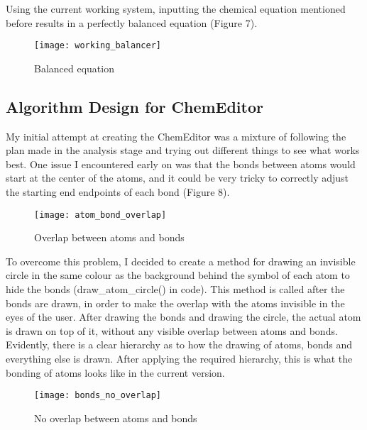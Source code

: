 \documentclass[a4paper,12pt]{article}
\begin{document}
Using the current working system, inputting the chemical equation mentioned before results in a perfectly balanced equation (Figure 7).

\begin{figure} [h]
	\centering
	\texttt{[image: working\_balancer]}
	\caption{Balanced equation}
	\label{fig:working_balancer}
\end{figure}

\newpage

\subsection{Algorithm Design for ChemEditor}

My initial attempt at creating the ChemEditor was a mixture of following the plan made in the analysis stage and trying out different things to see what works best. 
One issue I encountered early on was that the bonds between atoms would start at the center of the atoms, and it could be very tricky to correctly adjust the starting end endpoints of each bond (Figure 8).

\begin{figure} [h]
	\centering
	\texttt{[image: atom\_bond\_overlap]}
	\caption{Overlap between atoms and bonds}
	\label{fig:atom_bond_overlap}
\end{figure}

To overcome this problem, I decided to create a method for drawing an invisible circle in the same colour as the background behind the symbol of each atom to hide the bonds (draw\_atom\_circle() in code). This method is called after the bonds are drawn, in order to make the overlap with the atoms invisible in the eyes of the user. After drawing the bonds and drawing the circle, the actual atom is drawn on top of it, without any visible overlap between atoms and bonds. Evidently, there is a clear hierarchy as to how the drawing of atoms, bonds and everything else is drawn. After applying the required hierarchy, this is what the bonding of atoms looks like in the current version.

\begin{figure} [h]
	\centering
	\texttt{[image: bonds\_no\_overlap]}
	\caption{No overlap between atoms and bonds}
	\label{fig:bonds_no_overlap}
\end{figure}
\end{document}
